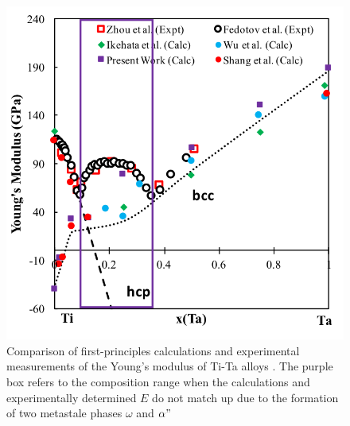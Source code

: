 \newpage
\begin{figure}[H]
	\centering
	\includegraphics[width=\textwidth]{Chapter-1/Figures/TiTaElastic.png}
	\caption{Comparison of first-principles calculations \cite{Wu2010a,Ikehata2004} and experimental measurements of the Young's modulus of Ti-Ta alloys \cite{Zhou2004a,Zhou2009a,Fedotov1985}. The purple box refers to the composition range when the calculations and experimentally determined $E$ do not match up due to the formation of two metastale phases $\omega$ and $\alpha"$}
	\label{Ch1-figure:titaelastic}
\end{figure}

